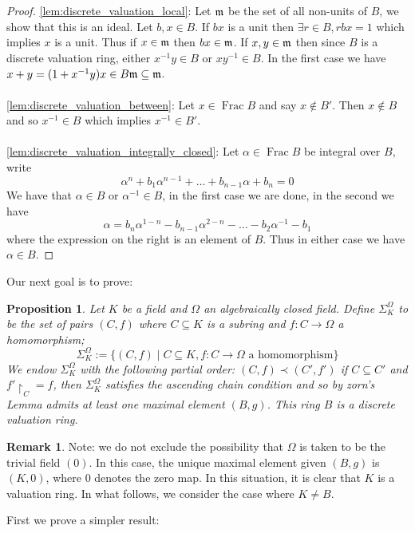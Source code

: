 \documentclass[12pt]{article}
\theoremstyle{plain}
\newtheorem{proposition}[thm]{Proposition}
\theoremstyle{definition}
\newtheorem{remark}[thm]{Remark}
\newcommand{\lto}{\longrightarrow}
\begin{document}
\begin{proof}
\ref{lem:discrete_valuation_local}: Let $\frak{m}$ be the set of all non-units of $B$, we show that this is an ideal. Let $b,x  \in B$. If $bx$ is a unit then $\exists r \in B, rbx = 1$ which implies $x$ is a unit. Thus if $x \in \frak{m}$ then $bx \in \frak{m}$. If $x,y \in \frak{m}$ then since $B$ is a discrete valuation ring, either $x^{-1}y \in B$ or $xy^{-1} \in B$. In the first case we have $x + y = (1 + x^{-1}y)x \in B\frak{m} \subseteq \frak{m}$.\\\\
%
\ref{lem:discrete_valuation_between}: Let $x \in \operatorname{Frac}B$ and say $x \not\in B'$. Then $x \not\in B$ and so $x^{-1} \in B$ which implies $x^{-1} \in B'$.\\\\
%
\ref{lem:discrete_valuation_integrally_closed}: Let $\alpha \in \operatorname{Frac}B$ be integral over $B$, write
\[\alpha^n + b_1\alpha^{n-1} + \hdots + b_{n-1}\alpha + b_n = 0\]
We have that $\alpha \in B$ or $\alpha^{-1} \in B$, in the first case we are done, in the second we have
\[\alpha = b_n \alpha^{1-n}  - b_{n-1}\alpha^{2-n} - \hdots - b_2\alpha^{-1} - b_1\]
where the expression on the right is an element of $B$. Thus in either case we have $\alpha \in B$.
\end{proof}
Our next goal is to prove:
\begin{proposition}
\label{prop:maximal_elt_DVR}
Let $K$ be a field and $\Omega$ an algebraically closed field. Define $\Sigma_K^\Omega$ to be the set of pairs $(C,f)$ where $C \subseteq K$ is a subring and $f: C \lto \Omega$ a homomorphism;
\[\Sigma_K^\Omega := \lbrace (C,f)\mid C \subseteq K, f: C \lto \Omega\text{ a homomorphism}\rbrace\]
We endow $\Sigma_K^\Omega$ with the following partial order: $(C,f) \prec (C',f')$ if $C \subseteq C'$ and $f'\restriction_{C} = f$, then $\Sigma_K^\Omega$ satisfies the ascending chain condition and so by zorn's Lemma admits at least one maximal element $(B,g)$. This ring $B$ is a discrete valuation ring.
\end{proposition}
\begin{remark}
Note: we do not exclude the possibility that $\Omega$ is taken to be the trivial field $(0)$. In this case, the unique maximal element given $(B,g)$ is $(K,0)$, where $0$ denotes the zero map. In this situation, it is clear that $K$ is a valuation ring. In what follows, we consider the case where $K \neq B$.
\end{remark}
First we prove a simpler result:
\end{document}
